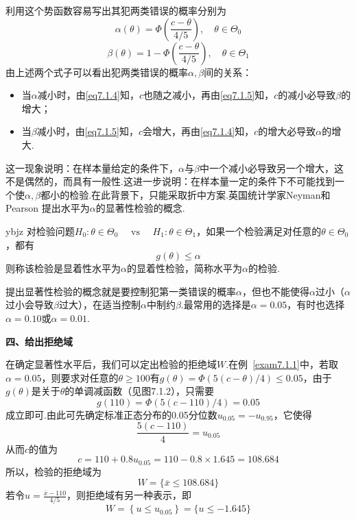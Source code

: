 利用这个势函数容易写出其犯两类错误的概率分别为
\begin{equation}\label{eq7.1.4}
\alpha\left(\theta\right)=\Phi\left(\frac{c-\theta}{4/5}\right),\quad\theta\in\Theta_0
\end{equation}
\begin{equation}\label{eq7.1.5}
\beta\left(\theta\right)=1-\Phi\left(\frac{c-\theta}{4/5}\right),\quad\theta\in\Theta_1
\end{equation}
由上述两个式子可以看出犯两类错误的概率$\alpha,\beta$间的关系：
\begin{itemize}
	\item 当$\alpha$减小时，由\ref{eq7.1.4}知，$c$也随之减小，再由\ref{eq7.1.5}知，$c$的减小必导致$\beta$的增大；
	\item 当$\beta$减小时，由\ref{eq7.1.5}知，$c$会增大，再由\ref{eq7.1.4}知，$c$的增大必导致$\alpha$的增大.
	
\end{itemize}
这一现象说明：在样本量给定的条件下，$\alpha$与$\beta$中一个减小必导致另一个增大，这不是偶然的，而具有一般性.这进一步说明：在样本量一定的条件下不可能找到一个使$\alpha,\beta$都小的检验.在此背景下，只能采取折中方案.英国统计学家Neyman和Pearson 提出水平为$\alpha$的显著性检验的概念.
\begin{definition}{}{ybjz}
	对检验问题$H _ { 0 } : \theta \in \Theta _ { 0 } \quad \text { vs } \quad H _ { 1 } : \theta \in \Theta _ { 1 }$，如果一个检验满足对任意的$\theta \in \Theta _ { 0 }$，都有
	\[g ( \theta ) \leq \alpha\]
	则称该检验是显着性水平为$\alpha$的显着性检验，简称水平为$\alpha$的检验.
\end{definition}
提出显著性检验的概念就是要控制犯第一类错误的概率$\alpha$，但也不能使得$\alpha$过小（$\alpha$过小会导致$\beta$过大），在适当控制$\alpha$中制约$\beta$.最常用的选择是$\alpha=0.05$，有时也选择$\alpha=0.10$或$\alpha=0.01$.

\textbf{四、给出拒绝域}

在确定显著性水平后，我们可以定出检验的拒绝域$W$.在例~\ref{exam7.1.1}中，若取$\alpha=0.05$，则要求对任意的$\theta\geq 100$有$g ( \theta ) = \Phi ( 5 ( c - \theta ) / 4 ) \leq 0.05$，由于$g(\theta)$是关于$\theta$的单调减函数（见图7.1.2），只需要
\[g ( 110 ) = \Phi ( 5 ( c - 110 ) / 4 ) = 0.05\]
成立即可.由此可先确定标准正态分布的0.05分位数$u _ { 0.05 } = - u _ { 0.95 }$，它使得
\[\frac { 5 ( c - 110 ) } { 4 } = u _ { 0.05 }\]
从而$c$的值为
\[c = 110 + 0.8 u _ { 0.05 } = 110 - 0.8 \times 1.645 = 108.684\]
所以，检验的拒绝域为
\[W = \{\overline { x } \leq 108.684 \}\]
若令$u = \frac { \overline { x } - 110 } { 4 / 5 }$，则拒绝域有另一种表示，即
\[W = \left\{ u \leq u _ { 0.05 } \right\} = \{ u \leq - 1.645 \}\]

